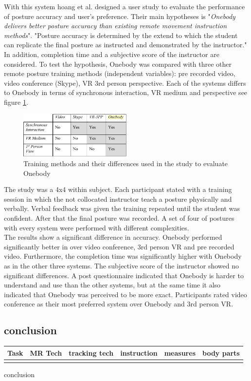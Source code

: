 With this system hoang et al. designed a user study to evaluate the performance of posture accuracy and user's preference. Their main hypotheses is "\textit{Onebody delivers better posture accuracy than existing remote movement instruction methods}". "Posture accuracy is determined by the extend to which the student can replicate the final posture as instructed and demonstrated by the instructor." In addition, completion time and a subjective score of the instructor are considered.
To test the hypothesis, Onebody was compared with three other remote posture training methods (independent variables): pre recorded video, video conference (Skype), VR 3rd person perspective. Each of the systems differs to Onebody in terms of synchronous interaction, VR medium and perspective see figure \ref{fig:ob2}.
\begin{figure}
	\centering
	\includegraphics[width=0.5\textwidth]{img/onebody_training_methods.PNG}
	\caption{Training methods and their differences used in the study to evaluate Onebody \cite{Reinoso2016}}
	\label{fig:ob2}
\end{figure}
The study was a 4x4 within subject. Each participant stated with a training session in which the not collocated instructor teach a posture physically and verbally. Verbal feedback was given the training repeated until the student was confident. After that the final posture was recorded. A set of four of postures with every system were performed with different complexities.\\
The results show a significant difference in accuracy. Onebody performed significantly better in over video conference, 3rd person VR and pre recorded video. Furthermore, the completion time was significantly higher with Onebody as in the other three systems. The subjective score of the instructor showed no significant differences. A post questionnaire indicated that Onebody is harder to understand and use than the other systems, but at the same time it also indicated that Onebody was perceived to be more exact. Participants rated video conference as their most preferred system over Onebody and 3rd person VR.

\subsection{conclusion}
\begin{table}[]
	\begin{tabular}{|l|l|l|l|l|l|}
		\hline
		Task & MR Tech & tracking tech & instruction & measures & body parts  \\ \hline
		&  &  &  &  &  \\ \hline
	\end{tabular}
\end{table}
conclusion



